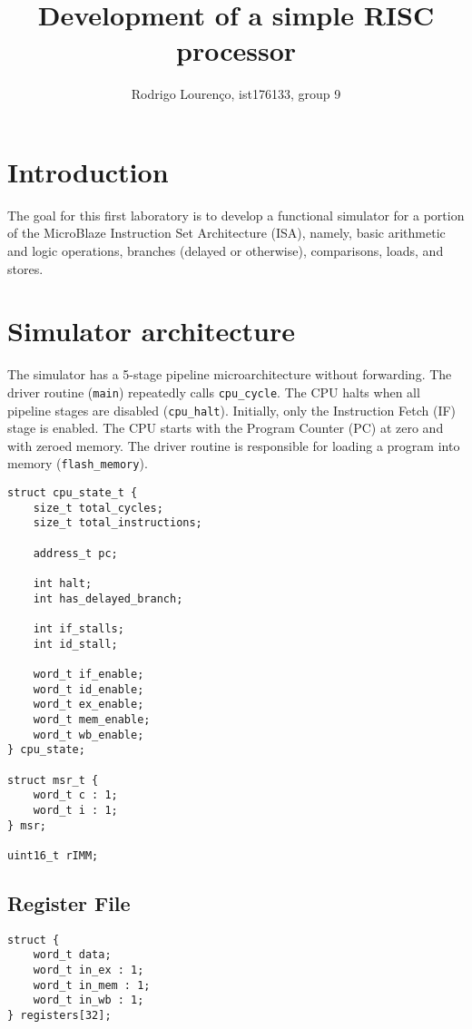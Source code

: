 \documentclass[]{IEEEtran}
\author{Rodrigo Lourenço, ist176133, group 9}
\title{Development of a simple RISC processor}
\begin{document}
\maketitle



\section{Introduction}

The goal for this first laboratory is to develop a functional simulator for a
portion of the MicroBlaze Instruction Set Architecture (ISA), namely, basic
arithmetic and logic operations, branches (delayed or otherwise), comparisons,
loads, and stores.



\section{Simulator architecture}

The simulator has a 5-stage pipeline microarchitecture without forwarding. The
driver routine (\verb|main|) repeatedly calls \verb|cpu_cycle|. The CPU halts
when all pipeline stages are disabled (\verb|cpu_halt|). Initially, only the
Instruction Fetch (IF) stage is enabled. The CPU starts with the Program Counter
(PC) at zero and with zeroed memory. The driver routine is responsible for
loading a program into memory (\verb|flash_memory|).

\begin{verbatim}
struct cpu_state_t {
    size_t total_cycles;
    size_t total_instructions;

    address_t pc;

    int halt;
    int has_delayed_branch;

    int if_stalls;
    int id_stall;

    word_t if_enable;
    word_t id_enable;
    word_t ex_enable;
    word_t mem_enable;
    word_t wb_enable;
} cpu_state;

struct msr_t {
    word_t c : 1;
    word_t i : 1;
} msr;

uint16_t rIMM;
\end{verbatim}




\subsection{Register File}

\begin{verbatim}
struct {
    word_t data;
    word_t in_ex : 1;
    word_t in_mem : 1;
    word_t in_wb : 1;
} registers[32];
\end{verbatim}
\end{document}
